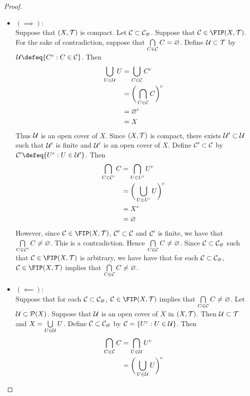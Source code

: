 \documentclass{book}
\begin{document}
	\begin{proof}\
		\begin{itemize}
			\item $(\implies)$: \\
			Suppose that $(X, \mathcal{T})$ is compact. Let $\mathcal{C} \subset \mathcal{C}_{\varnothing}$. Suppose that $\MC \in \FIP(X, \MT)$. For the sake of contradiction, suppose that $\bigcap\limits_{C \in \mathcal{C}} C = \varnothing$. Define $\mathcal{U} \subset \mathcal{T}$ by $\MU \defeq \{C^c: C \in \MC\}$. Then 
			\begin{align*}
				\bigcup_{U \in \mathcal{U}} U
				& = \bigcup_{C \in \mathcal{C}} C^c \\
				& = \bigg( \bigcap_{C \in \mathcal{C}} C \bigg)^c \\
				& = \varnothing^c \\
				& = X
			\end{align*}
			Thus $\mathcal{U}$ is an open cover of $X$. Since $(X, \mathcal{T})$ is compact, there exists $\mathcal{U}' \subset \mathcal{U}$ such that $\mathcal{U}'$ is finite and $\mathcal{U}'$ is an open cover of $X$. Define $\mathcal{C}' \subset \mathcal{C}$ by $\MC' \defeq \{U^c: U \in \MU'\}$. Then 
			\begin{align*}
				\bigcap_{C \in \mathcal{C}'} C 
				& = \bigcap_{U \in U'} U^c \\
				& = \bigg( \bigcup_{U \in U'} U \bigg)^c \\
				& = X^c \\
				& = \varnothing
			\end{align*}  
			However, since $\MC \in \FIP(X, \MT)$, $\mathcal{C}' \subset \mathcal{C}$ and $\mathcal{C}'$ is finite, we have that $\bigcap\limits_{C \in \mathcal{C}'} C \neq \varnothing$. This is a contradiction. Hence $\bigcap\limits_{C \in \mathcal{C}} C \neq \varnothing$. Since $\mathcal{C} \subset \mathcal{C}_{\varnothing}$ such that $\MC \in \FIP(X, \MT)$ is arbitrary, we have have that for each $\mathcal{C} \subset \mathcal{C}_\varnothing$, $\MC \in \FIP(X, \MT)$ implies that $\bigcap\limits_{C \in \mathcal{C}} C \neq \varnothing$. 
			\item $(\impliedby)$: \\
			Suppose that for each $\mathcal{C} \subset \mathcal{C}_\varnothing$, $\MC \in \FIP(X, \MT)$ implies that $\bigcap\limits_{C \in \mathcal{C}} C \neq \varnothing$. Let $\mathcal{U} \subset \mathcal{P}(X)$. Suppose that $\mathcal{U}$ is an open cover of $X$ in $(X, \mathcal{T})$. Then $\mathcal{U} \subset \mathcal{T}$ and $X = \bigcup\limits_{U \in \mathcal{U}} U$. Define $\mathcal{C} \subset \mathcal{C}_{\varnothing}$ by $\mathcal{C} = \{U^c: U \in \mathcal{U}\}$. Then 
			\begin{align*}
				\bigcap_{C \in \MC} C
				& = \bigcap_{U \in \MU} U^c \\
				& = \bigg( \bigcup_{U \in \MU} U \bigg)^c \\

\end{align*}
\end{itemize}
\end{proof}
\end{document}
